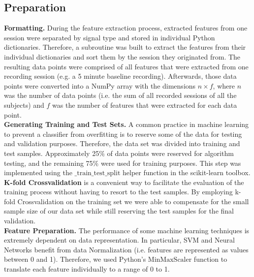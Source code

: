 \subsection{Preparation} 
\textbf{Formatting.} During the feature extraction process, extracted features from one session were separated by signal type and stored in individual Python dictionaries. Therefore, a subroutine was built to extract the features from their individual dictionaries and sort them by the session they originated from. The resulting data points were comprised of all features that were extracted from one recording session (e.g. a 5 minute baseline recording).
Afterwards, those data points were converted into a NumPy array with the dimensions $n \times f$, where $n$ was the number of data points (i.e. the sum of all recorded sessions of all the subjects) and $f$ was the number of features that were extracted for each data point.\\
\textbf{Generating Training and Test Sets.} A common practice in machine learning to prevent a classifier from overfitting is to reserve some of the data for testing and validation purposes. Therefore, the data set was divided into training and test samples. Approximately 25\% of data points were reserved for algorithm testing, and the remaining 75\% were used for training purposes. This step was implemented using the $\text{\_train\_test\_split}$ helper function in the scikit-learn toolbox.\\
\textbf{K-fold Crossvalidation} is a convenient way to facilitate the evaluation of the training process without having to resort to the test samples. By employing k-fold Crossvalidation on the training set we were able to compensate for the small sample size of our data set while still reserving the test samples for the final validation.\\
\textbf{Feature Preparation.} The performance of some machine learning techniques is extremely dependent on data representation. In particular, SVM and Neural Networks benefit from data Normalization (i.e. features are represented as values between 0 and 1). Therefore, we used Python's $\text{MinMaxScaler}$ function to translate each feature individually to a range of 0 to 1.\\

\newpage
